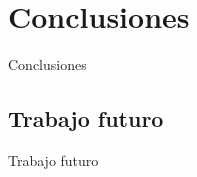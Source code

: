 
\section{Conclusiones}
\begin{frame}{Conclusiones}
\end{frame}

\subsection{Trabajo futuro}
\begin{frame}{Trabajo futuro}

\end{frame}
